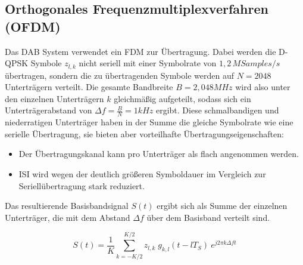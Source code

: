 \subsection{Orthogonales Frequenzmultiplexverfahren (OFDM)}
\label{sec:ofdm}
Das DAB System verwendet ein \ac{FDM} zur Übertragung. Dabei werden die D-QPSK Symbole $z_{l,k}$ nicht seriell mit einer Symbolrate von $1,2\, M Samples / s$ übertragen, sondern die zu übertragenden Symbole werden auf $N=2048$ Unterträgern verteilt. Die gesamte Bandbreite $B = 2,048 MHz$ wird also unter den einzelnen Unterträgern $k$ gleichmäßig aufgeteilt, sodass sich ein Unterträgerabstand von $\Delta f = \frac{B}{N} = 1kHz$ ergibt. Diese schmalbandigen und niederratigen Unterträger haben in der Summe die gleiche Symbolrate wie eine serielle Übertragung, sie bieten aber vorteilhafte Übertragungseigenschaften:
\begin{itemize}
\item Der Übertragungskanal kann pro Unterträger als flach angenommen werden.
\item \ac{ISI} wird wegen der deutlich größeren Symboldauer im Vergleich zur Seriellübertragung stark reduziert.
\end{itemize}
Das resultierende Basisbandsignal $S(t)$ ergibt sich als Summe der einzelnen Unterträger, die mit dem Abstand $\Delta f$ über dem Basisband verteilt sind.

\begin{equation}
    S(t) = \frac{1}{K} \sum \limits_{k=-K/2}^{K/2} z_{l,k} \; g_{k,l}(t-lT_S) \: e^{j2\pi k \Delta f t}
\label{eq:ofdm_dft}
\end{equation}

